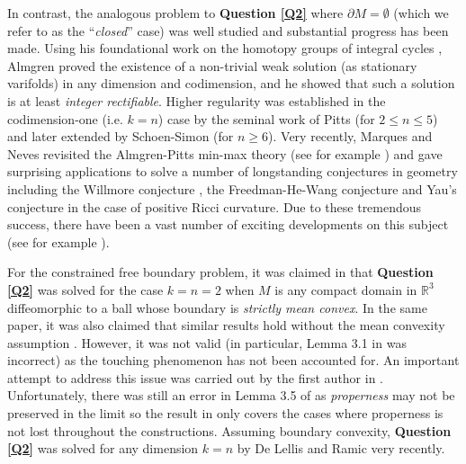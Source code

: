 \documentclass[10pt]{amsart}
\theoremstyle{definition}
\theoremstyle{remark}
\numberwithin{equation}{section}
\newcommand{\R}{\mathbb{R}}
\begin{document}
In contrast, the analogous problem to \textbf{Question \ref{Q2}} where $\partial M=\emptyset$ (which we refer to as the ``\emph{closed}'' case) was well studied and substantial progress has been made. Using his foundational work on the homotopy groups of integral cycles \cite{Almgren62}, Almgren \cite[Theorem 15.1]{Almgren65} proved the existence of a non-trivial weak solution (as stationary varifolds) in any dimension and codimension, and he showed that such a solution is at least \emph{integer rectifiable}. Higher regularity was established in the codimension-one (i.e. $k=n$) case by the seminal work of Pitts \cite{Pitts} (for $2 \leq n \leq 5$) and later extended by Schoen-Simon \cite{Schoen-Simon81} (for $n \geq 6$). 
Very recently, Marques and Neves revisited the Almgren-Pitts min-max theory (see for example \cite{Marques-Neves-survey}) and gave surprising applications to solve a number of longstanding conjectures in geometry including the Willmore conjecture \cite{Marques-Neves14}, the Freedman-He-Wang conjecture \cite{Agol-Marques-Neves16} and Yau's conjecture \cite{Marques-Neves17} in the case of positive Ricci curvature. Due to these tremendous success, there have been a vast number of exciting developments on this subject (see for example \cite{Liokumovich-Marques-Neves} \cite{Marques-Neves16} \cite{Zhou15} \cite{Zhou17}). 

For the constrained free boundary problem, it was claimed in \cite[Theorem 4.1]{Jost86} that \textbf{Question \ref{Q2}} was solved for the case $k=n=2$ when $M$ is any compact domain in $\R^3$ diffeomorphic to a ball whose boundary is \emph{strictly mean convex}. In the same paper, it was also claimed that similar results hold without the mean convexity assumption \cite[Theorem 4.2]{Jost86}. However, it was not valid (in particular, Lemma 3.1 in \cite{Jost86} was incorrect) as the touching phenomenon has not been accounted for. An important attempt to address this issue was carried out by the first author in \cite{Li15}. Unfortunately, there was still an error in Lemma 3.5 of \cite{Li15} as \emph{properness} may not be preserved in the limit so the result in \cite{Li15} only covers the cases where properness is not lost throughout the constructions. Assuming boundary convexity, \textbf{Question \ref{Q2}} was solved for any dimension $k=n$ by De Lellis and Ramic \cite{DeLellis-Ramic} very recently.
\end{document}
